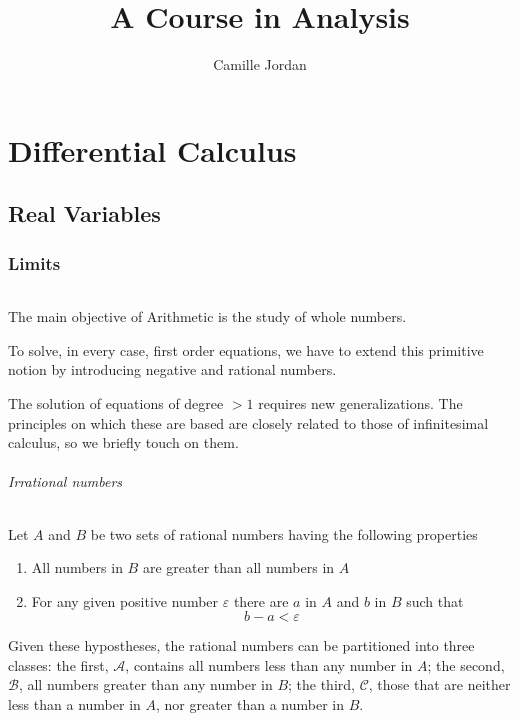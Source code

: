\documentclass[10pt,letterpaper]{book}
\title{A Course in Analysis}
\author{Camille Jordan}
\renewcommand\epsilon{\varepsilon}
\theoremstyle{definition}
\begin{document}
\maketitle
\tableofcontents


\part{Differential Calculus}

\chapter{Real Variables}

\section{Limits}

\paragraph{} 
The main objective of Arithmetic is the study of whole numbers.

To solve, in every case, first order equations, we have to extend this primitive notion by introducing negative and rational numbers.

The solution of equations of degree $> 1$ requires new generalizations. The principles on which these are based are closely related to those of infinitesimal calculus, so we briefly touch on them.


\paragraph{Irrational numbers} Let $A$ and $B$ be two sets of rational numbers having the following properties
\begin{enumerate}
\item All numbers in $B$ are greater than all numbers in $A$
\item For any given positive number $\epsilon$ there are $a$ in $A$ and $b$ in $B$ such that
\[
  b - a < \epsilon
\]
\end{enumerate}
Given these hypostheses, the rational numbers can be partitioned into three classes: the first, $\mathcal{A}$, contains all numbers less than any number in $A$; the second, $\mathcal B$, all numbers greater than any number in $B$; the third, $\mathcal C$, those that are neither less than a number in $A$, nor greater than a number in $B$.
\end{document}
